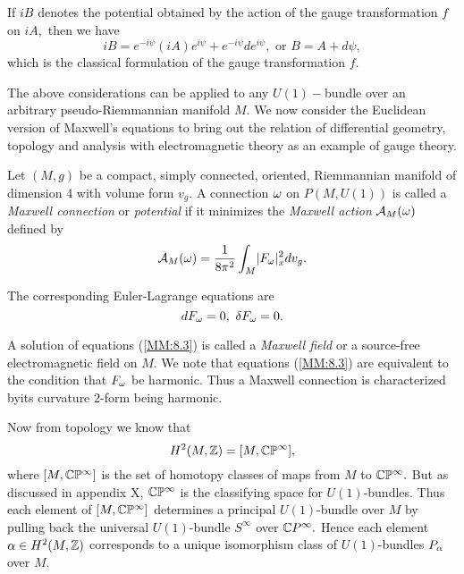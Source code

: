 If $iB$ denotes the potential obtained by the action of the gauge transformation $f$ on $iA,$ then we have
$$
iB=e^{-i\psi}(iA)e^{i\psi}+e^{-i\psi}d e^{i\psi},\text{ or }B=A+d\psi,
$$ 
which is the classical formulation of the gauge transformation $f$. 

 
The above considerations can be applied to any $U(1)-$bundle over an arbitrary pseudo-Riemmannian manifold $M.$ We now
consider the Euclidean version of Maxwell's equations to bring out the relation of differential geometry, topology and
analysis with electromagnetic theory as an example of gauge theory. 

Let $(M,g)$ be a compact, simply connected, oriented, Riemmannian manifold of dimension 4 with volume form $v_{g}.$ A
connection $\omega$ on $P(M, U(1))$ is called a \emph{Maxwell connection} or \emph{potential} if it minimizes the
\emph{Maxwell action} $\mathcal{A}_{M}(\omega)$ defined by
\begin{equation}
 \label{MM:8.2}
\mathcal{A}_{M}(\omega)=\frac{1}{8\pi^{2}}\int_{M} \lvert F_{\omega} \rvert^{2}_{x}dv_{g}.
\end{equation}

The corresponding Euler-Lagrange equations are
\begin{equation}
 \label{MM:8.3}
dF_{\omega}=0, \ \delta F_{\omega}=0.
\end{equation}

A solution of equations (\ref{MM:8.3}) is called a \emph{Maxwell field} or a source-free electromagnetic field on $M.$
We note that equations (\ref{MM:8.3}) are equivalent to the condition that $F_{\omega}$ be harmonic. Thus a Maxwell
connection is characterized byits curvature 2-form being harmonic.

Now from topology we know that
$$
H^{2}(M, \mathbb Z)=[M, \mathbb C \mathbb{P}^{\infty}],
$$
where $[M, \mathbb C \mathbb{P}^{\infty}]$ is the set of homotopy classes of maps from $M$ to $\mathbb C \mathbb{P}^{\infty}.$ But as discussed in
appendix X, $\mathbb C \mathbb{P}^{\infty}$ is the classifying space for $U(1)$-bundles. Thus each element of $[M, \mathbb C \mathbb{P}^{\infty}]$
determines a principal $U(1)$-bundle over $M$ by pulling back the universal $U(1)$-bundle $S^{\infty}$ over $\mathbb C
P^{\infty}.$ Hence each element $\alpha \in H^{2}(M, \mathbb Z)$ corresponds to a unique isomorphism class of $U(1)$-bundles
$P_{\alpha}$ over $M.$

